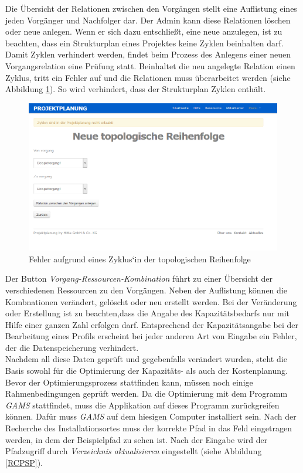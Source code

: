 \documentclass[a4paper,12pt,parskip,bibtotoc,liststotoc]{article}
\begin{document}
Die Übersicht der Relationen zwischen den Vorgängen stellt eine Auflistung eines jeden Vorgänger und Nachfolger dar. Der Admin kann diese Relationen löschen oder neue anlegen. Wenn er sich dazu entschließt, eine neue anzulegen, ist zu beachten, dass ein Strukturplan eines Projektes keine Zyklen beinhalten darf. Damit Zyklen verhindert werden, findet beim Prozess des Anlegens einer neuen Vorgangsrelation eine Prüfung statt. Beinhaltet die neu angelegte Relation einen Zyklus, tritt ein Fehler auf und die Relationen muss überarbeitet werden (siehe Abbildung \ref{VorErr}). So wird verhindert, dass der Strukturplan Zyklen enthält.\\

\begin{figure}[h!]
  \begin{center}
    \includegraphics[width=120mm]{Bilder/Vorgangsrel_Fehler.png}
    \caption{Fehler aufgrund eines Zyklus`in der topologischen Reihenfolge}  \label{VorErr}
  \end{center}
\end{figure}
 
Der Button \textit{Vorgang-Ressourcen-Kombination} führt zu einer Übersicht der verschiedenen Ressourcen zu den Vorgängen. Neben der Auflistung können die Kombnationen verändert, gelöscht oder neu erstellt werden. Bei der Veränderung oder Erstellung ist zu beachten,dass die Angabe des Kapazitätsbedarfs nur mit Hilfe einer ganzen Zahl erfolgen darf. Entsprechend der Kapazitätsangabe bei der Bearbeitung eines Profils erscheint bei jeder anderen Art von Eingabe ein Fehler, der die Datenspeicherung verhindert.\\
Nachdem all diese Daten geprüft und gegebenfalls verändert wurden, steht die Basis sowohl für die Optimierung der Kapazitäts- als auch der Kostenplanung. Bevor der Optimierungsprozess stattfinden kann, müssen noch einige Rahmenbedingungen geprüft werden. Da die Optimierung mit dem Programm \textit{GAMS} stattfindet, muss die Applikation auf dieses Programm zurückgreifen können. Dafür muss \textit{GAMS} auf dem hiesigen Computer installiert sein. Nach der Recherche des Installationsortes muss der korrekte Pfad in das Feld eingetragen werden, in dem der Beispielpfad zu sehen ist. Nach der Eingabe wird der Pfadzugriff durch \textit{Verzeichnis aktualisieren} eingestellt (siehe Abbildung \ref{RCPSP}).
\end{document}
